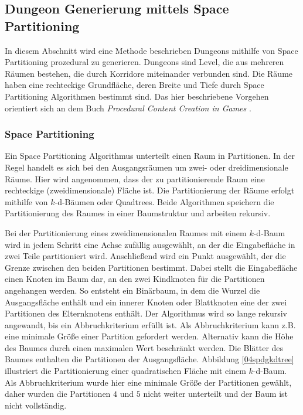 \subsection{Dungeon Generierung mittels Space Partitioning}\label{WG:SpacePartitioning}
In diesem Abschnitt wird eine Methode beschrieben Dungeons mithilfe von Space Partitioning prozedural zu generieren. Dungeons sind Level, die aus mehreren Räumen bestehen, die durch Korridore miteinander verbunden sind. Die Räume haben eine rechteckige Grundfläche, deren Breite und Tiefe durch Space Partitioning Algorithmen bestimmt sind. Das hier beschriebene Vorgehen orientiert sich an dem Buch \textit{Procedural Content Creation in Games} \cite{Shaker2016}.

\subsubsection*{Space Partitioning}
Ein Space Partitioning Algorithmus unterteilt einen Raum in Partitionen. In der Regel handelt es sich bei den Ausgangsräumen um zwei- oder dreidimensionale Räume. Hier wird angenommen, dass der zu partitionierende Raum eine rechteckige (zweidimensionale) Fläche ist. Die Partitionierung der Räume erfolgt mithilfe von $k$-d-Bäumen oder Quadtrees. Beide Algorithmen speichern die Partitionierung des Raumes in einer Baumstruktur und arbeiten rekursiv.

Bei der Partitionierung eines zweidimensionalen Raumes mit einem $k$-d-Baum wird in jedem Schritt eine Achse zufällig ausgewählt, an der die Eingabefläche in zwei Teile partitioniert wird. Anschließend wird ein Punkt ausgewählt, der die Grenze zwischen den beiden Partitionen bestimmt. Dabei stellt die Eingabefläche einen Knoten im Baum dar, an den zwei Kindknoten für die Partitionen angehangen werden. So entsteht ein Binärbaum, in dem die Wurzel die Ausgangsfläche enthält und ein innerer Knoten oder Blattknoten eine der zwei Partitionen des Elternknotens enthält. Der Algorithmus wird so lange rekursiv angewandt, bis ein Abbruchkriterium erfüllt ist. Als Abbruchkriterium kann z.B. eine minimale Größe einer Partition gefordert werden. Alternativ kann die Höhe des Baumes durch einen maximalen Wert beschränkt werden. Die Blätter des Baumes enthalten die Partitionen der Ausgangsfläche. Abbildung \ref{04spdgkdtree} illustriert die Partitionierung einer quadratischen Fläche mit einem $k$-d-Baum. Als Abbruchkriterium wurde hier eine minimale Größe der Partitionen gewählt, daher wurden die Partitionen $4$ und $5$ nicht weiter unterteilt und der Baum ist nicht vollständig. 


